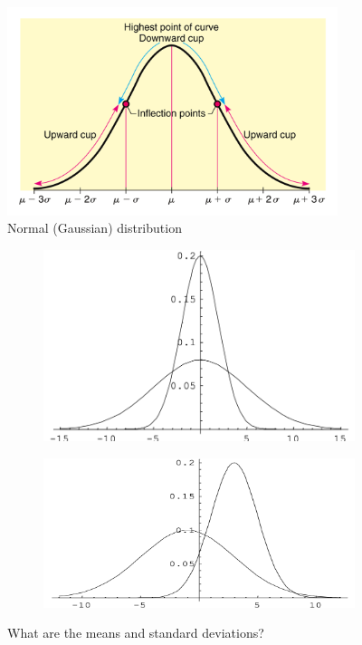 \documentclass[12pt]{amsart}
\newcommand{\m}{\mu}
\newcommand{\s}{\sigma}
\begin{document}
{\begin{itemize}
\end{itemize}

\begin{figure}[h!]
  \includegraphics[width=3.8in]{img/normal_curve_Brase.png}
  \caption{Normal (Gaussian) distribution}
  \label{fig:normal}
\end{figure}


\begin{figure}[h!]
  \centering
  \begin{subfigure}[b]{0.47\linewidth}
    \includegraphics[width=\linewidth]{img/normal_curves_compare_v1.png}
  \end{subfigure}
  \begin{subfigure}[b]{0.52\linewidth}
    \includegraphics[width=\linewidth]{img/normal_curves_compare_v2.png}
  \end{subfigure}
  \caption{What are the means and standard deviations?}
\end{figure}


}
\end{document}
